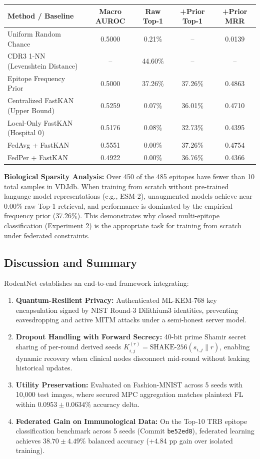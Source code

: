 \documentclass[11pt,a4paper]{article}
\begin{document}
\begin{center}
\begin{longtable}{@{}p{4.8cm}cccc@{}}
\toprule
\textbf{Method / Baseline} & \textbf{Macro AUROC} & \textbf{Raw Top-1} & \textbf{+Prior Top-1} & \textbf{+Prior MRR} \\
\midrule
\endhead
Uniform Random Chance            & 0.5000 & 0.21\% & --      & 0.0139 \\
CDR3 1-NN (Levenshtein Distance) & --     & 44.60\%& --      & --     \\
Epitope Frequency Prior          & 0.5000 & 37.26\%& 37.26\% & 0.4863 \\
\midrule
Centralized FastKAN (Upper Bound)& 0.5259 & 0.07\% & 36.01\% & 0.4710 \\
Local-Only FastKAN (Hospital 0)  & 0.5176 & 0.08\% & 32.73\% & 0.4395 \\
FedAvg + FastKAN                 & 0.5551 & 0.00\% & 37.26\% & 0.4754 \\
FedPer + FastKAN                 & 0.4922 & 0.00\% & 36.76\% & 0.4366 \\
\bottomrule
\end{longtable}
\end{center}

\textbf{Biological Sparsity Analysis:} Over 450 of the 485 epitopes have fewer than 10 total samples in VDJdb. When training from scratch without pre-trained language model representations (e.g., ESM-2), unaugmented models achieve near 0.00\% raw Top-1 retrieval, and performance is dominated by the empirical frequency prior (37.26\%). This demonstrates why closed multi-epitope classification (Experiment 2) is the appropriate task for training from scratch under federated constraints.

\subsection{Discussion and Summary}
RodentNet establishes an end-to-end framework integrating:
\begin{enumerate}
    \item \textbf{Quantum-Resilient Privacy:} Authenticated ML-KEM-768 key encapsulation signed by NIST Round-3 Dilithium3 identities, preventing eavesdropping and active MITM attacks under a semi-honest server model.
    \item \textbf{Dropout Handling with Forward Secrecy:} 40-bit prime Shamir secret sharing of per-round derived seeds $K_{i,j}^{(r)} = \text{SHAKE-256}(s_{i,j} \parallel r)$, enabling dynamic recovery when clinical nodes disconnect mid-round without leaking historical updates.
    \item \textbf{Utility Preservation:} Evaluated on Fashion-MNIST across 5 seeds with 10{,}000 test images, where secured MPC aggregation matches plaintext FL within $0.0953 \pm 0.0634\%$ accuracy delta.
    \item \textbf{Federated Gain on Immunological Data:} On the Top-10 TRB epitope classification benchmark across 5 seeds (Commit \lstinline|be52ed8|), federated learning achieves $38.70 \pm 4.49\%$ balanced accuracy (+4.84 pp gain over isolated training).
\end{enumerate}
\end{document}
